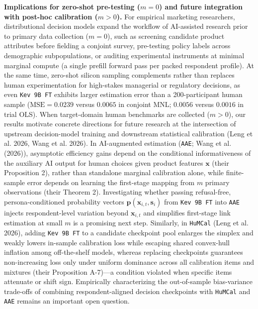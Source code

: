\documentclass[
  letterpaper,
  DIV=11,
  numbers=noendperiod]{scrartcl}
\begin{document}
\textbf{Implications for zero-shot pre-testing (\(m = 0\)) and future
integration with post-hoc calibration (\(m > 0\)).} For empirical
marketing researchers, distributional decision models expand the
workflow of AI-assisted research prior to primary data collection
(\(m = 0\)), such as screening candidate product attributes before
fielding a conjoint survey, pre-testing policy labels across demographic
subpopulations, or auditing experimental instruments at minimal marginal
compute (a single prefill forward pass per packed respondent profile).
At the same time, zero-shot silicon sampling complements rather than
replaces human experimentation for high-stakes managerial or regulatory
decisions, as even \texttt{Kev\ 9B\ FT} exhibits larger estimation error
than a 200-participant human sample (\(\mathrm{MSE} = 0.0239\) versus
\(0.0065\) in conjoint MNL; \(0.0056\) versus \(0.0016\) in trial OLS).
When target-domain human benchmarks are collected (\(m > 0\)), our
results motivate concrete directions for future research at the
intersection of upstream decision-model training and downstream
statistical calibration (Leng et al. 2026, Wang et al. 2026). In
AI-augmented estimation (\texttt{AAE}; Wang et al. (2026)), asymptotic
efficiency gains depend on the conditional informativeness of the
auxiliary AI output for human choices given product features
\(\mathbf{x}\) (their Proposition 2), rather than standalone marginal
calibration alone, while finite-sample error depends on learning the
first-stage mapping from \(m\) primary observations (their Theorem 2).
Investigating whether passing refusal-free, persona-conditioned
probability vectors \(\mathbf{p}(\mathbf{x}_{i,t}, \mathbf{s}_i)\) from
\texttt{Kev\ 9B\ FT} into \texttt{AAE} injects respondent-level
variation beyond \(\mathbf{x}_{i,t}\) and simplifies first-stage link
estimation at small \(m\) is a promising next step. Similarly, in
\texttt{HuMCal} (Leng et al. 2026), adding \texttt{Kev\ 9B\ FT} to a
candidate checkpoint pool enlarges the simplex and weakly lowers
in-sample calibration loss while escaping shared convex-hull inflation
among off-the-shelf models, whereas replacing checkpoints guarantees
non-increasing loss only under uniform dominance across all calibration
items and mixtures (their Proposition A-7)---a condition violated when
specific items attenuate or shift sign. Empirically characterizing the
out-of-sample bias-variance trade-offs of combining respondent-aligned
decision checkpoints with \texttt{HuMCal} and \texttt{AAE} remains an
important open question.
\end{document}
